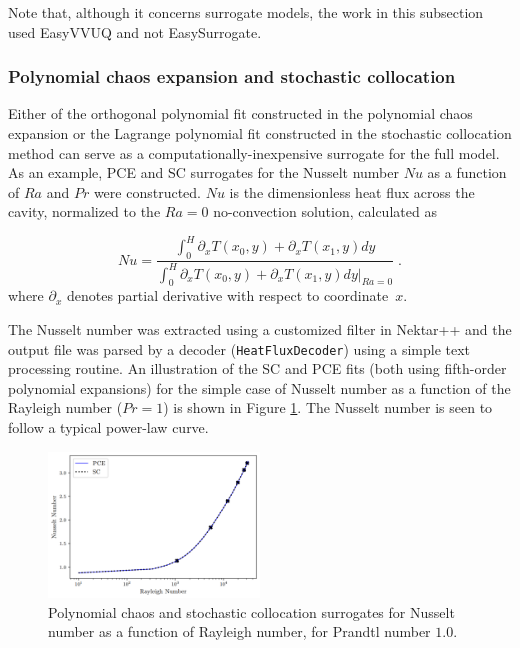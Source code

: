 Note that, although it concerns surrogate models, the work in this subsection used EasyVVUQ and not EasySurrogate.

\subsubsection{Polynomial chaos expansion and stochastic collocation}\label{sec:pceasc}

Either of the orthogonal polynomial fit constructed in the polynomial chaos expansion or the Lagrange polynomial fit constructed in the stochastic collocation method can serve as a computationally-inexpensive surrogate for the full model.  
As an example, PCE and SC surrogates for the Nusselt number $Nu$ as a function of $Ra$ and $Pr$ were constructed.  $Nu$ is the dimensionless heat flux across the cavity, normalized to the $Ra=0$ no-convection solution, calculated as

\begin{equation}
Nu = \frac{ \int_0^H \partial_x T(x_0,y)+\partial_x T(x_1,y) dy }{ \int_0^H \partial_x T(x_0,y)+\partial_x T(x_1,y) dy \rvert_{Ra=0}} \; .
\end{equation}
where $\partial_x$ denotes partial derivative with respect to coordinate~$x$.

The Nusselt number was extracted using a customized filter in Nektar++ and the output file was parsed by a decoder (\texttt{HeatFluxDecoder}) using a simple text processing routine.  
An illustration of the SC and PCE fits (both using fifth-order polynomial expansions) for the simple case of Nusselt number as a function of the Rayleigh number ($Pr=1$) is shown in Figure \ref{fig:nektar_surrogate}.  
The Nusselt number is seen to follow a typical power-law curve.

\begin{figure}[tbp]
\begin{centering}
\includegraphics[width=0.5\textwidth]{nektar_surrogate.png}
\caption{\small Polynomial chaos and stochastic collocation surrogates for Nusselt number as a function of Rayleigh number, for Prandtl number $1.0$.
\label{fig:nektar_surrogate}
}
\par
\end{centering}
\end{figure}

